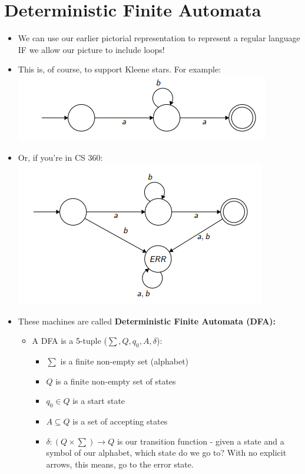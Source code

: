 \documentclass[12pt]{article}
\begin{document}
\section{Deterministic Finite Automata}
\begin{itemize}
    \item We can use our earlier pictorial representation to represent a regular language IF we allow our picture to include loops!
    \item This is, of course, to support Kleene stars.  For example:\\
        \includegraphics{loop.png}
    \item Or, if you're in CS 360: \\
        \includegraphics{loop_err.png}
    \item These machines are called \textbf{Deterministic Finite Automata (DFA):}
        \begin{itemize}
            \item A DFA is a 5-tuple ($\sum, Q, q_0, A, \delta$):
                \begin{itemize}
                    \item $\sum$ is a finite non-empty set (alphabet)
                    \item $Q$ is a finite non-empty set of states
                    \item $q_0 \in Q$ is a start state
                    \item $A \subseteq Q$ is a set of accepting states
                    \item $\delta : (Q \times \sum) \rightarrow Q$ is our transition function - given a state and a symbol of our alphabet, which state do we go to?  With no explicit arrows, this means, go to the error state.

\end{itemize}
\end{itemize}
\end{itemize}
\end{document}
